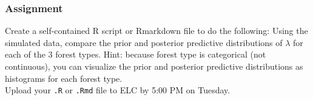 \documentclass[color=usenames,dvipsnames]{beamer}\usepackage[]{graphicx}\usepackage[]{xcolor}
\begin{document}
\begin{frame}[fragile]
  \frametitle{Assignment}
  \footnotesize
  Create a self-contained R script or Rmarkdown file
  to do the following:
  \vfill
    \footnotesize
    Using the simulated data, compare the prior and posterior
      predictive distributions of $\lambda$ for each of the 3 forest
      types. Hint: because forest type is categorical (not
      continuous), you can visualize the prior and posterior
      predictive distributions as histograms for each forest type.  \\
  \vfill
  Upload your {\tt .R} or {\tt .Rmd} file to ELC by 5:00 PM on Tuesday.
\end{frame}
\end{document}
